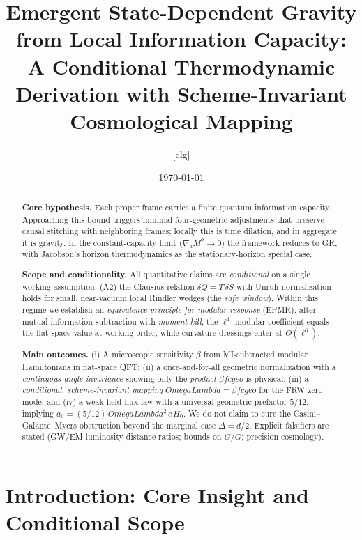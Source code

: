 \documentclass[aps,prd,onecolumn,superscriptaddress,nofootinbib]{revtex4-2}
\def\OmL{OmegaLambda}%
\def\cgeo{cgeo}%
\newcommand{\OmL}{\Omega_\Lambda}
\newcommand{\cgeo}{c_{\rm geo}}
\begin{document}
\title{Emergent State-Dependent Gravity from Local Information Capacity:
\texorpdfstring{\\}{ }A Conditional Thermodynamic Derivation with Scheme-Invariant Cosmological Mapping}

\author{[clg]}
\date{\today}

\begin{abstract}
\textbf{Core hypothesis.} Each proper frame carries a finite quantum information capacity. Approaching this bound triggers minimal four-geometric adjustments that preserve causal stitching with neighboring frames; locally this is time dilation, and in aggregate it is gravity. In the constant-capacity limit (\(\nabla_a M^2\!\to\!0\)) the framework reduces to GR, with Jacobson’s horizon thermodynamics as the stationary-horizon special case.

\textbf{Scope and conditionality.} All quantitative claims are \emph{conditional} on a single working assumption: (A2) the Clausius relation \(\delta Q=T\,\delta S\) with Unruh normalization holds for small, near-vacuum local Rindler wedges (the \emph{safe window}). Within this regime we establish an \emph{equivalence principle for modular response} (EPMR): after mutual-information subtraction with \emph{moment-kill}, the \(\ell^4\) modular coefficient equals the flat-space value at working order, while curvature dressings enter at \(O(\ell^6)\).

\textbf{Main outcomes.} (i) A microscopic sensitivity \(\beta\) from MI-subtracted modular Hamiltonians in flat-space QFT; (ii) a once-and-for-all geometric normalization with a \emph{continuous-angle invariance} showing only the \emph{product} \(\beta f \cgeo\) is physical; (iii) a \emph{conditional, scheme-invariant mapping} \(\OmL=\beta f \cgeo\) for the FRW zero mode; and (iv) a weak-field flux law with a universal geometric prefactor \(5/12\), implying \(a_0=(5/12)\,\OmL^2\,c\,H_0\). We do not claim to cure the Casini–Galante–Myers obstruction beyond the marginal case \(\Delta=d/2\). Explicit falsifiers are stated (GW/EM luminosity-distance ratios; bounds on \(\dot G/G\); precision cosmology).
\end{abstract}

\maketitle

\section{Introduction: Core Insight and Conditional Scope}
\label{sec:intro}
\end{document}
